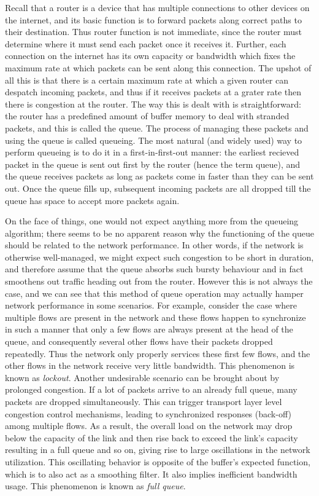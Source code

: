 \documentclass[12pt]{article}
\begin{document}
Recall that a router is a device that has multiple connections to other devices on the internet, and its basic function is to forward packets along correct paths to their destination. Thus router function is not immediate, since the router must determine where it must send each packet once it receives it. Further, each connection on the internet has its own capacity or bandwidth which fixes the maximum rate at which packets can be sent along this connection. The upshot of all this is that there is a certain maximum rate at which a given router can despatch incoming packets, and thus if it receives packets at a grater rate then there is congestion at the router. The way this is dealt with is straightforward: the router has a predefined amount of buffer memory to deal with stranded packets, and this is called the queue. The process of managing these packets and using the queue is called queueing. The most natural (and widely used) way to perform queueing is to do it in a first-in-first-out manner: the earliest recieved packet in the  queue is sent out first by the router (hence the term queue), and the queue receives packets as long as packets come in faster than they can be sent out. Once the queue fills up, subsequent incoming packets are all dropped till the queue has space to accept more packets again.

On the face of things, one would not expect anything more from the queueing algorithm; there seems to be no apparent reason why the functioning of the queue should be related to the network performance. In other words, if the network is otherwise well-managed, we might expect such congestion to be short in duration, and therefore assume that the queue absorbs such bursty behaviour and in fact smoothens out traffic heading out from the router. However this is not always the case, and we can see that this method of queue operation may actually hamper network performance in some scenarios. For example, consider the case where multiple flows are present in the network and these flows happen to synchronize in such a manner that only a few flows are always present at the head of the queue, and consequently several other flows have their packets dropped repeatedly. Thus the network only properly services these first few flows, and the other flows in the network receive very little bandwidth. This phenomenon is known as \textit{lockout}. Another undesirable scenario can be brought about by prolonged congestion. If a lot of packets arrive to an already full queue, many packets are dropped simultaneously. This can trigger transport layer level congestion control mechanisms, leading to synchronized responses (back-off) among multiple flows. As a result, the overall load on the network may drop below the capacity of the link and then rise back to exceed the link's capacity resulting in a full queue and so on, giving rise to large oscillations in the network utilization. This oscillating behavior is opposite of the buffer's expected function, which is to also act as a smoothing filter. It also implies inefficient bandwidth usage. This phenomenon is known as \textit{full queue}.
\end{document}
